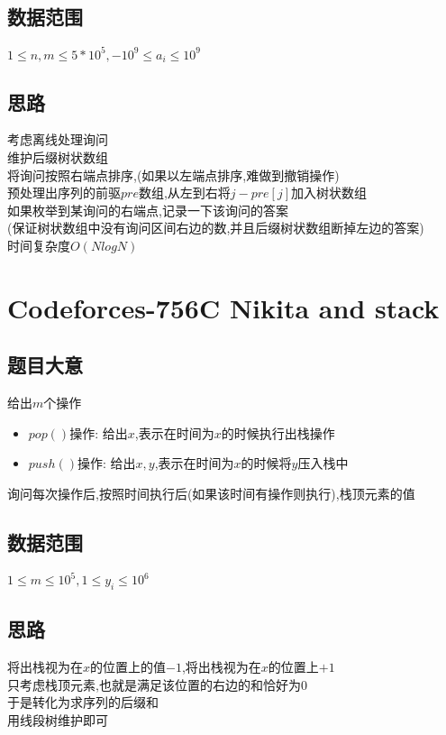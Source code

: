\documentclass{ctexart}
\numberwithin{equation}{section}
\begin{document}
\begin{flushleft}
  \subsection{数据范围}
  $1\le n,m\le 5*10^5,-10^9\le a_i\le 10^9 $ \\
  \subsection{思路}
  考虑离线处理询问 \\
  维护后缀树状数组 \\
  将询问按照右端点排序,(如果以左端点排序,难做到撤销操作) \\
  预处理出序列的前驱$pre$数组,从左到右将$j-pre[j]$加入树状数组 \\
  如果枚举到某询问的右端点,记录一下该询问的答案\\
  (保证树状数组中没有询问区间右边的数,并且后缀树状数组断掉左边的答案) \\
  时间复杂度$O(NlogN)$ \\
  \newpage

  \section{Codeforces-756C Nikita and stack}
  \subsection{题目大意}
  给出$m$个操作 \\
  \begin{itemize}
  \item $pop()$操作: 给出$x$,表示在时间为$x$的时候执行出栈操作 \\
  \item $push()$操作: 给出$x,y$,表示在时间为$x$的时候将$y$压入栈中\\
  \end{itemize}
  询问每次操作后,按照时间执行后(如果该时间有操作则执行),栈顶元素的值\\
  \subsection{数据范围}
  $1\le m\le 10^5,1\le y_i\le 10^6 $ \\
  \subsection{思路}
  将出栈视为在$x$的位置上的值$-1$,将出栈视为在$x$的位置上$+1$ \\
  只考虑栈顶元素,也就是满足该位置的右边的和恰好为$0$ \\
  于是转化为求序列的后缀和 \\
  用线段树维护即可 \\
  \newpage


\end{flushleft}
\end{document}
